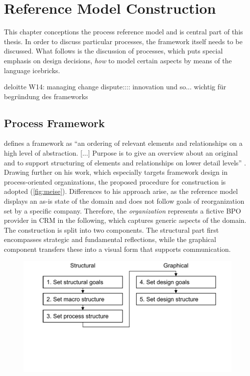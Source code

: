 
\chapter{Reference Model Construction}

This chapter conceptions the process reference model and is central part of this thesis. In order to discuss particular processes, the framework itself needs to be discussed. What follows is the discussion of processes, which puts special emphasis on design decisions, \viz \textit{how} to model certain aspects by means of the language icebricks. 

	deloitte W14: managing change dispute:::: innovation und so... wichtig für begründung des frameworks
	\section{Process Framework}
	
	\citeauthor{Meise2001} defines a framework as \enquote{an ordering of relevant elements and relationships on a high level of abstraction. [...] Purpose is to give an overview about an original and to support structuring of elements and relationships on lower detail levels} \citep[]{Meise2001}. Drawing further on his work, which especially targets framework design in process-oriented organizations, the proposed procedure for construction is adopted (\Fig \ref{fig:meise}). Differences to his approach arise, as the reference model displays an as-is state of the domain and does not follow goals of reorganization set by a specific company. Therefore, the \textit{organization} represents a fictive BPO provider in CRM in the following, which captures generic aspects of the domain. The construction is split into two components. The structural part first encompasses strategic and fundamental reflections, while the graphical component transfers these into a visual form that supports communication.

	\begin{figure}[caption={Procedure for framework construction}, label={fig:meise}]
		{	\includegraphics[width=.8\textwidth]{figures/framework-meise.pdf}}
		\parbox{0.7\textwidth }{}
	\end{figure} 
	
